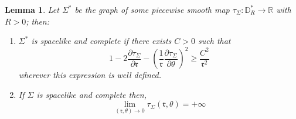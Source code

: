 \documentclass[a4paper,12pt]{article}
\def\r{\mathfrak{r}}
\def\RR{\mathbb{R}}
\newtheorem{lemou}{Lemma}[section]          %
\begin{document}
      
      \begin{lemou}\label{btzlem:surface_complete}\label{lem:surface_complete}Let $\Sigma^*$ be the graph of some piecewise smooth map $\tau_\Sigma: \mathbb D_R^*\rightarrow \RR$ with $R>0$; then:
      \begin{enumerate}


      \item $\Sigma^*$ is spacelike and complete  if there exists $C>0$ such that
	$$ 1-2\frac{\partial \tau_\Sigma}{\partial \r}-\left(\frac{1}{\r}\frac{\partial \tau_\Sigma}{\partial \theta}\right)^2\geq\frac{C^2}{\r^2}$$ 
	wherever this expression is well defined.
      \item  If $\Sigma$ is spacelike and complete then, 
		$$ \lim_{(\r,\theta) \rightarrow 0}\tau_\Sigma(\r,\theta) = +\infty$$
      \end{enumerate}
      \end{lemou}
\end{document}

